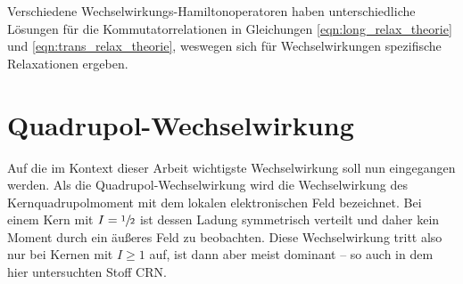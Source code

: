 Verschiedene Wechselwirkungs-Hamiltonoperatoren haben unterschiedliche Lösungen für die Kommutatorrelationen in Gleichungen \eqref{eqn:long_relax_theorie} und \eqref{eqn:trans_relax_theorie}, weswegen sich für Wechselwirkungen spezifische Relaxationen ergeben.





\section{Quadrupol-Wechselwirkung} \label{section:theo:qww}

Auf die im Kontext dieser Arbeit wichtigste Wechselwirkung soll nun eingegangen werden. Als die Quadrupol-Wechselwirkung wird die Wechselwirkung des Kernquadrupolmoment mit dem lokalen elektronischen Feld bezeichnet. Bei einem Kern mit $I = \sfrac{1}{2}$ ist dessen Ladung symmetrisch verteilt und daher kein Moment durch ein äußeres Feld zu beobachten. Diese Wechselwirkung tritt also nur bei Kernen mit $I \ge 1$ auf, ist dann aber meist dominant -- so auch in dem hier untersuchten Stoff CRN.

